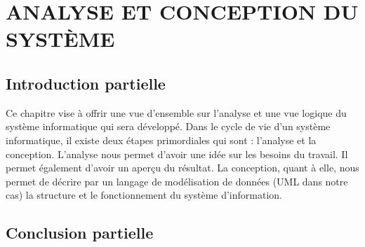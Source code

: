 \chapter[ANALYSE ET CONCEPTION DU SYSTÈME]{ANALYSE ET CONCEPTION DU SYSTÈME}
    \section[Introduction partielle]{Introduction partielle}
    Ce chapitre vise à offrir une vue d’ensemble sur l’analyse et une vue logique du
    système informatique qui sera développé. Dans le cycle de vie d’un système informatique,
    il existe deux étapes primordiales qui sont : l’analyse et la conception. L’analyse nous
    permet d’avoir une idée sur les besoins du travail. Il permet également d’avoir un aperçu
    du résultat. La conception, quant à elle, nous permet de décrire par un langage de
    modélisation de données (UML dans notre cas) la structure et le fonctionnement du
    système d’information.
        
        
        
        
        
    \section[Conclusion partielle]{Conclusion partielle}